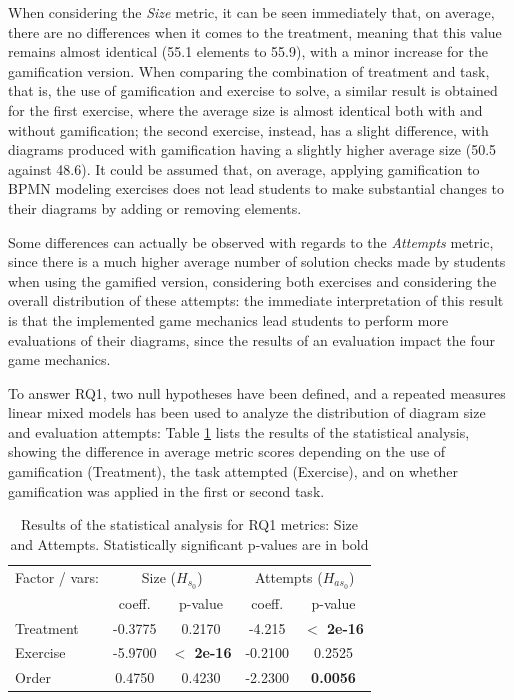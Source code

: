 When considering the \textit{Size} metric, it can be seen immediately that, on average, there are no differences when it comes to the treatment, meaning that this value remains almost identical (55.1 elements to 55.9), with a minor increase for the gamification version. When comparing the combination of treatment and task, that is, the use of gamification and exercise to solve, a similar result is obtained for the first exercise, where the average size is almost identical both with and without gamification; the second exercise, instead, has a slight difference, with diagrams produced with gamification having a slightly higher average size (50.5 against 48.6). It could be assumed that, on average, applying gamification to BPMN modeling exercises does not lead students to make substantial changes to their diagrams by adding or removing elements.

Some differences can actually be observed with regards to the \textit{Attempts} metric, since there is a much higher average number of solution checks made by students when using the gamified version, considering both exercises and considering the overall distribution of these attempts: the immediate interpretation of this result is that the implemented game mechanics lead students to perform more evaluations of their diagrams, since the results of an evaluation impact the four game mechanics.

To answer RQ1, two null hypotheses have been defined, and a repeated measures linear mixed models has been used to analyze the distribution of diagram size and evaluation attempts: Table \ref{tab:tabrq1_anova} lists the results of the statistical analysis, showing the difference in average metric scores depending on the use of gamification (Treatment), the task attempted (Exercise), and on whether gamification was applied in the first or second task.

\begin{table}[ht]
  \centering
  \footnotesize
  \caption{Results of the statistical analysis for RQ1 metrics: Size and Attempts. Statistically significant p-values are in bold}
  \label{tab:tabrq1_anova}
    \begin{tabular}{lcccc}
         \toprule
         Factor / vars:& 
         \multicolumn{2}{c}{Size (${H_{s_{0}}}$)} & \multicolumn{2}{c}{Attempts (${H_{as_{0}}}$)} \\
         & coeff. & p-value & coeff. & p-value \\
         \midrule
         Treatment & -0.3775	& 0.2170 & -4.215 & \textbf{$\lt$ 2e-16} \\
         Exercise & -5.9700 & \textbf{ $\lt$ 2e-16} & -0.2100 & 0.2525\\
         Order & 0.4750 & 0.4230 & -2.2300 &	\textbf{0.0056}\\
         \bottomrule
    \end{tabular}

\end{table}

